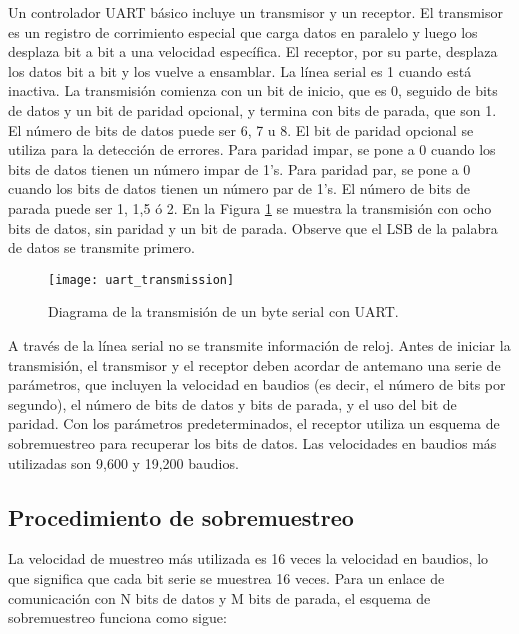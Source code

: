     Un controlador UART básico incluye un transmisor y un receptor. El transmisor es un registro de corrimiento especial que carga datos en paralelo y luego los desplaza bit a bit a una velocidad específica. El receptor, por su parte, desplaza los datos bit a bit y los vuelve a ensamblar. La línea serial es 1 cuando está inactiva. La transmisión comienza con un bit de inicio, que es 0, seguido de bits de datos y un bit de paridad opcional, y termina con bits de parada, que son 1. El número de bits de datos puede ser 6, 7 u 8. El bit de paridad opcional se utiliza para la detección de errores. Para paridad impar, se pone a 0 cuando los bits de datos tienen un número impar de 1's. Para paridad par, se pone a 0 cuando los bits de datos tienen un número par de 1's. El número de bits de parada puede ser 1, 1,5 ó 2. En la Figura \ref{fig:uart_transmission} se muestra la transmisión con ocho bits de datos, sin paridad y un bit de parada. Observe que el LSB de la palabra de datos se transmite primero.

    \begin{figure}[!h]
      \centering
      \texttt{[image: uart\_transmission]}
      \caption{Diagrama de la transmisión de un byte serial con UART.}
      \label{fig:uart_transmission}
    \end{figure}

    A través de la línea serial no se transmite información de reloj. Antes de iniciar la transmisión, el transmisor y el receptor deben acordar de antemano una serie de parámetros, que incluyen la velocidad en baudios (es decir, el número de bits por segundo), el número de bits de datos y bits de parada, y el uso del bit de paridad. Con los parámetros predeterminados, el receptor utiliza un esquema de sobremuestreo para recuperar los bits de datos. Las velocidades en baudios más utilizadas son 9,600 y 19,200 baudios.

    \subsection{Procedimiento de sobremuestreo}

    La velocidad de muestreo más utilizada es 16 veces la velocidad en baudios, lo que significa que cada bit serie se muestrea 16 veces. Para un enlace de comunicación con N bits de datos y M bits de parada, el esquema de sobremuestreo funciona como sigue:
    
